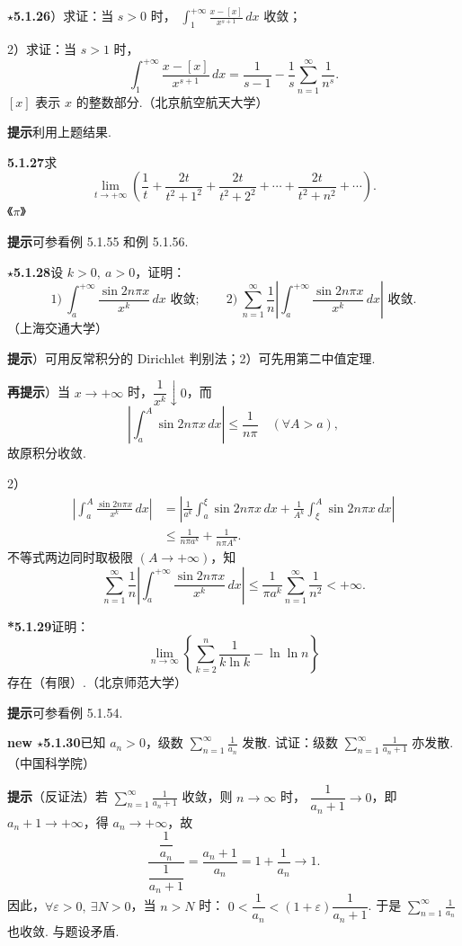 \documentclass[UTF8,12pt,a4paper,fontset=fandol]{ctexart}
\begin{document}
\noindent\textbf{$\star$5.1.26}）求证：当 $s>0$ 时，
$\displaystyle\int_1^{+\infty}\frac{x-[x]}{x^{s+1}}\,dx$ 收敛；

2）求证：当 $s>1$ 时，
\[
  \int_1^{+\infty}\frac{x-[x]}{x^{s+1}}\,dx
  =\frac1{s-1}-\frac1s\sum_{n=1}^{\infty}\frac1{n^s}.
\]
$[x]$ 表示 $x$ 的整数部分.（北京航空航天大学）

\noindent\textbf{提示}\quad 利用上题结果.

\noindent\textbf{5.1.27}\quad 求
\[
  \lim_{t\to+\infty}\left(\frac1t+\frac{2t}{t^2+1^2}+\frac{2t}{t^2+2^2}+\cdots+\frac{2t}{t^2+n^2}+\cdots\right).
\]
《$\pi$》

\noindent\textbf{提示}\quad 可参看例 5.1.55 和例 5.1.56.

\noindent\textbf{$\star$5.1.28}\quad 设 $k>0,\ a>0$，证明：
\[
  1)\ \int_a^{+\infty}\frac{\sin 2n\pi x}{x^k}\,dx\text{ 收敛};\qquad
  2)\ \sum_{n=1}^{\infty}\frac1n\left|\int_a^{+\infty}\frac{\sin 2n\pi x}{x^k}\,dx\right|\text{ 收敛}.
\]
（上海交通大学）

\noindent\textbf{提示}）可用反常积分的 Dirichlet 判别法；2）可先用第二中值定理.

\noindent\textbf{再提示}）当 $x\to+\infty$ 时，$\dfrac1{x^k}\downarrow0$，而
\[
  \left|\int_a^A\sin2n\pi x\,dx\right|\le\frac1{n\pi}\quad(\forall A>a),
\]
故原积分收敛.

2）
\[
\begin{aligned}
\left|\int_a^A\frac{\sin2n\pi x}{x^k}\,dx\right|
&=\left|\frac1{a^k}\int_a^\xi\sin2n\pi x\,dx+
\frac1{A^k}\int_\xi^A\sin2n\pi x\,dx\right|\\
&\le \frac1{n\pi a^k}+\frac1{n\pi A^k}.
\end{aligned}
\]
不等式两边同时取极限 $(A\to+\infty)$，知
\[
  \sum_{n=1}^{\infty}\frac1n\left|\int_a^{+\infty}\frac{\sin2n\pi x}{x^k}\,dx\right|
  \le \frac1{\pi a^k}\sum_{n=1}^{\infty}\frac1{n^2}<+\infty.
\]

\noindent\textbf{*5.1.29}\quad 证明：
\[
  \lim_{n\to\infty}\left\{\sum_{k=2}^n\frac1{k\ln k}-\ln\ln n\right\}
\]
存在（有限）.（北京师范大学）

\noindent\textbf{提示}\quad 可参看例 5.1.54.

\noindent\textbf{new $\star$5.1.30}\quad 已知 $a_n>0$，级数
$\displaystyle\sum_{n=1}^{\infty}\frac1{a_n}$ 发散. 试证：级数
$\displaystyle\sum_{n=1}^{\infty}\frac1{a_n+1}$ 亦发散.（中国科学院）

\noindent\textbf{提示}\quad （反证法）若 $\displaystyle\sum_{n=1}^{\infty}\frac1{a_n+1}$ 收敛，则 $n\to\infty$ 时，
$\dfrac1{a_n+1}\to0$，即 $a_n+1\to+\infty$，得 $a_n\to+\infty$，故
\[
  \frac{\dfrac1{a_n}}{\dfrac1{a_n+1}}=\frac{a_n+1}{a_n}=1+\frac1{a_n}\to1.
\]
因此，$\forall\varepsilon>0,\ \exists N>0$，当 $n>N$ 时：
$0<\dfrac1{a_n}<(1+\varepsilon)\dfrac1{a_n+1}$. 于是
$\displaystyle\sum_{n=1}^{\infty}\frac1{a_n}$ 也收敛. 与题设矛盾.
\end{document}
